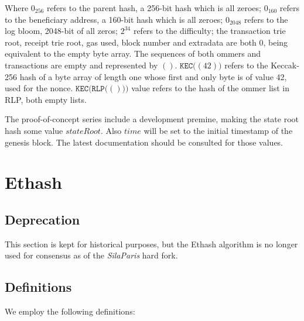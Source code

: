 \documentclass[9pt,oneside]{amsart}
\begin{document}
Where $0_{256}$ refers to the parent hash, a 256-bit hash which is all zeroes; $0_{160}$ refers to the beneficiary address, a 160-bit hash which is all zeroes; $0_{2048}$ refers to the log bloom, 2048-bit of all zeros; $2^{34}$ refers to the difficulty; the transaction trie root, receipt trie root, gas used, block number and extradata are both $0$, being equivalent to the empty byte array. The sequences of both ommers and transactions are empty and represented by $()$. $\mathtt{KEC}\big( (42) \big)$ refers to the Keccak-256 hash of a byte array of length one whose first and only byte is of value 42, used for the nonce. $\mathtt{KEC}\big(\mathtt{RLP}\big( () \big)\big)$ value refers to the hash of the ommer list in RLP, both empty lists.

The proof-of-concept series include a development premine, making the state root hash some value $stateRoot$. Also $time$ will be set to the initial timestamp of the genesis block. The latest documentation should be consulted for those values.

\section{Ethash}\label{app:ethash}
\subsection{Deprecation}
This section is kept for historical purposes, but the Ethash algorithm is no longer used for consensus as of the \textit{SilaParis} hard fork.

\subsection{Definitions}
We employ the following definitions:
\end{document}
